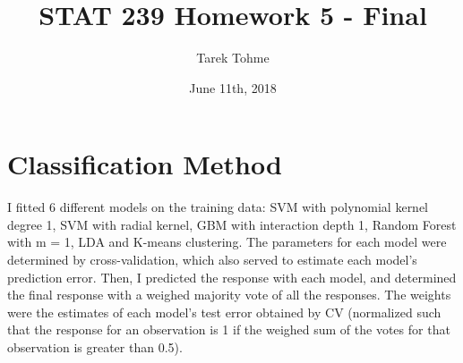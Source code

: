 \documentclass{article}
\begin{document}
\title{STAT 239 Homework 5 - Final}
\author{Tarek Tohme}
\date{June 11th, 2018}
\maketitle

\section*{Classification Method}

I fitted 6 different models on the training data: SVM with polynomial kernel degree 1, SVM with radial kernel, GBM with interaction depth 1, Random Forest with m = 1, LDA and K-means clustering. The parameters for each model were determined by cross-validation, which also served to estimate each model's prediction error. Then, I predicted the response with each model, and determined the final response with a weighed majority vote of all the responses. The weights were the estimates of each model's test error obtained by CV (normalized such that the response for an observation is 1 if the weighed sum of the votes for that observation is greater than 0.5).
\end{document}
